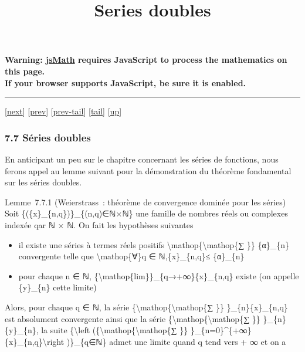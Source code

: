 \documentclass[]{article}
\title{Series doubles}
\author{}
\date{}
\begin{document}
\maketitle

\textbf{Warning: \href{http://www.math.union.edu/locate/jsMath}{jsMath}
requires JavaScript to process the mathematics on this page.\\ If your
browser supports JavaScript, be sure it is enabled.}

\begin{center}\rule{3in}{0.4pt}\end{center}

{[}\href{coursse42.html}{next}{]} {[}\href{coursse40.html}{prev}{]}
{[}\href{coursse40.html\#tailcoursse40.html}{prev-tail}{]}
{[}\hyperref[tailcoursse41.html]{tail}{]}
{[}\href{coursch8.html\#coursse41.html}{up}{]}

\subsubsection{7.7 Séries doubles}

En anticipant un peu sur le chapitre concernant les séries de fonctions,
nous ferons appel au lemme suivant pour la démonstration du théorème
fondamental sur les séries doubles.

Lemme~7.7.1 (Weierstrass~: théorème de convergence dominée pour les
séries) Soit \{(\{x\}\_\{n,q\})\}\_\{(n,q)∈ℕ×ℕ\} une famille de nombres
réels ou complexes indexée qar ℕ × ℕ. On fait les hypothèses suivantes

\begin{itemize}
\itemsep1pt\parskip0pt
\item
  il existe une séries à termes réels positifs
  \textbackslash{}mathop\{\textbackslash{}mathop\{∑ \}\} \{α\}\_\{n\}
  convergente telle que \textbackslash{}mathop\{∀\}q ∈
  ℕ,\textbar{}\{x\}\_\{n,q\}\textbar{}≤ \{α\}\_\{n\}
\item
  pour chaque n ∈ ℕ,
  \{\textbackslash{}mathop\{lim\}\}\_\{q→+∞\}\{x\}\_\{n,q\} existe (on
  appelle \{y\}\_\{n\} cette limite)
\end{itemize}

Alors, pour chaque q ∈ ℕ, la série
\{\textbackslash{}mathop\{\textbackslash{}mathop\{∑ \}\}
\}\_\{n\}\{x\}\_\{n,q\} est absolument convergente ainsi que la série
\{\textbackslash{}mathop\{\textbackslash{}mathop\{∑ \}\}
\}\_\{n\}\{y\}\_\{n\}, la suite \{\textbackslash{}left
(\{\textbackslash{}mathop\{\textbackslash{}mathop\{∑ \}\}
\}\_\{n=0\}\^{}\{+∞\}\{x\}\_\{n,q\}\textbackslash{}right )\}\_\{q∈ℕ\}
admet une limite quand q tend vers + ∞ et on a
\end{document}
